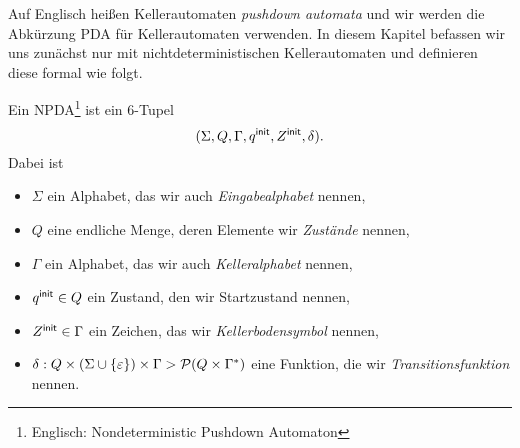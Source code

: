 Auf Englisch heißen Kellerautomaten \emph{pushdown automata} und wir werden die Abkürzung \ac{PDA} für Kellerautomaten verwenden. 
In diesem Kapitel befassen wir uns zunächst nur mit nichtdeterministischen Kellerautomaten und definieren diese formal wie folgt.


\begin{Def}[name={[NPDA]}]
        Ein \ac{NPDA}\footnote{Englisch: Nondeterministic Pushdown Automaton} ist ein 6-Tupel 
        $$(\Sigma,Q,\Gamma,q^\mathsf{init},Z^\mathsf{init},\delta).$$
        Dabei ist
        \begin{itemize}
		\item $\Sigma$ ein Alphabet, das wir auch \emph{Eingabealphabet} nennen,
                \item $Q$ eine endliche Menge, deren Elemente wir \emph{Zustände} nennen,
                \item $\Gamma$ ein Alphabet, das wir auch \emph{Kelleralphabet} nennen,
                \item $q^\mathsf{init}\in Q$ ein Zustand, den wir Startzustand nennen,
                \item $Z^\mathsf{init}\in\Gamma$ ein Zeichen, das wir \emph{Kellerbodensymbol} nennen,
                \item $\delta: Q\times(\Sigma\cup\{\varepsilon\})\times\Gamma \-> \mathcal{P}(Q\times\Gamma^*)$ eine Funktion, die wir \emph{Transitionsfunktion} nennen. \qedhere
        \end{itemize}
\end{Def}

